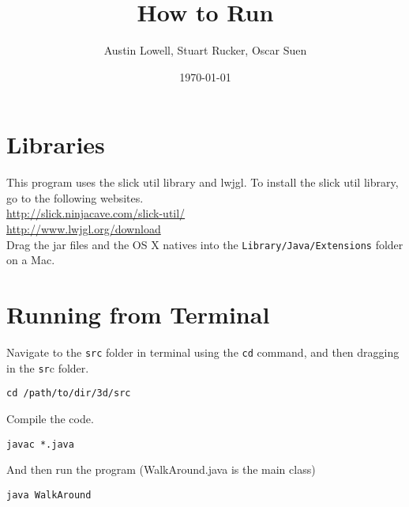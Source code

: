\documentclass[12pt]{article}
\title{How to Run}
\author{Austin Lowell, Stuart Rucker, Oscar Suen}
\date{\today}
\begin{document}
\maketitle
\section{Libraries}
This program uses the slick util library and lwjgl. To install the slick util library, go to the following websites.\\
\url{http://slick.ninjacave.com/slick-util/}\\
\url{http://www.lwjgl.org/download}\\

Drag the jar files and the OS X natives into the \texttt{Library/Java/Extensions} folder on a Mac.

\section{Running from Terminal}
Navigate to the \texttt{src} folder in terminal using the \texttt{cd} command, and then dragging in the \texttt{sr}c folder.
\begin{verbatim}
cd /path/to/dir/3d/src 
\end{verbatim} 
Compile the code.
\begin{verbatim}
javac *.java
\end{verbatim} 
And then run the program (WalkAround.java is the main class)
\begin{verbatim}
java WalkAround
\end{verbatim} 
\end{document}
